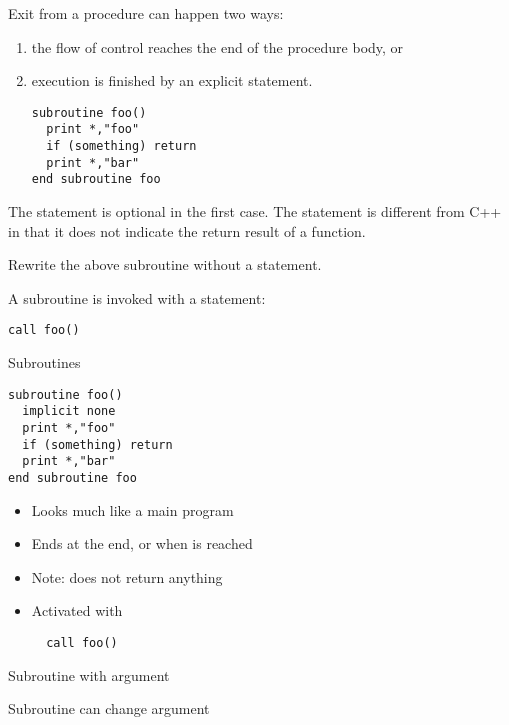 Exit from a procedure can happen two ways:
\begin{enumerate}
\item the flow of control reaches the end of the procedure body, or
\item execution is finished by an explicit 
  statement.
\begin{lstlisting}
subroutine foo()
  print *,"foo"
  if (something) return
  print *,"bar"
end subroutine foo
\end{lstlisting}
\end{enumerate}
The  statement is optional in the first case.
The  statement is different from C++ in that it does not
indicate the return result of a function.

\begin{exercise}
  Rewrite the above subroutine  without a  statement.
\end{exercise}

A subroutine is invoked with a  statement:
\begin{lstlisting}
call foo()
\end{lstlisting}

\begin{slide}{Subroutines}
  \label{sl:subroutine}
\begin{lstlisting}
subroutine foo()
  implicit none
  print *,"foo"
  if (something) return
  print *,"bar"
end subroutine foo
\end{lstlisting}
\begin{itemize}
\item Looks much like a main program
\item Ends at the end, or when  is reached
\item Note:  does not return anything
\item Activated with 
\begin{lstlisting}
  call foo()
\end{lstlisting}
\end{itemize}
\end{slide}

\begin{block}{Subroutine with argument}
  \label{sl:fsubr-arg}
\end{block}

\begin{block}{Subroutine can change argument}
  \label{sl:fsubr-inout}
\end{block}

